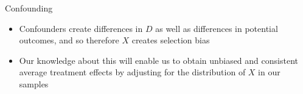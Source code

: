 \documentclass{beamer}
\begin{document}
\begin{frame}{Confounding}

  \begin{itemize}
          \item Confounders create differences in $D$ as well as differences in potential outcomes, and so therefore $X$ creates selection bias \\

          \begin{center}
          \end{center}

          \item Our knowledge about this will enable us to obtain unbiased and consistent average treatment effects by adjusting for the distribution of $X$ in our samples
  \end{itemize}
\end{frame}
\end{document}
